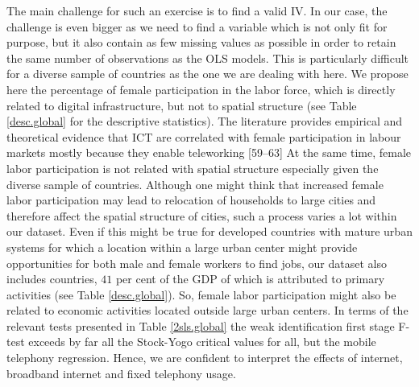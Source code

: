 \documentclass[10pt,letterpaper]{article}
\begin{document}
The main challenge for such an exercise is to find a valid IV. In our
case, the challenge is even bigger as we need to find a variable which
is not only fit for purpose, but it also contain as few missing values
as possible in order to retain the same number of observations as the
OLS models. This is particularly difficult for a diverse sample of
countries as the one we are dealing with here. We propose here the
percentage of female participation in the labor force, which is directly
related to digital infrastructure, but not to spatial structure (see
Table \ref{desc.global} for the descriptive statistics). The literature
provides empirical and theoretical evidence that ICT are correlated with
female participation in labour markets mostly because they enable
teleworking {[}59--63{]} At the same time, female labor participation is
not related with spatial structure especially given the diverse sample
of countries. Although one might think that increased female labor
participation may lead to relocation of households to large cities and
therefore affect the spatial structure of cities, such a process varies
a lot within our dataset. Even if this might be true for developed
countries with mature urban systems for which a location within a large
urban center might provide opportunities for both male and female
workers to find jobs, our dataset also includes countries, \(41\) per
cent of the GDP of which is attributed to primary activities (see Table
\ref{desc.global}). So, female labor participation might also be related
to economic activities located outside large urban centers. In terms of
the relevant tests presented in Table \ref{2sls.global} the weak
identification first stage F-test exceeds by far all the Stock-Yogo
critical values for all, but the mobile telephony regression. Hence, we
are confident to interpret the effects of internet, broadband internet
and fixed telephony usage.
\end{document}
